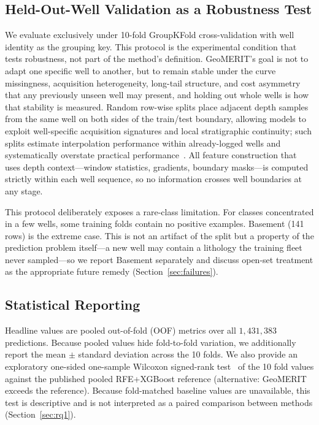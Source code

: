 \documentclass[bdcc,article,submit,pdftex,moreauthors]{Definitions/mdpi}
\begin{document}
\subsection{Held-Out-Well Validation as a Robustness Test}
\label{sec:protocol}
We evaluate exclusively under 10-fold GroupKFold cross-validation with well identity as the
grouping key. This protocol is the experimental condition that tests robustness, not part of
the method's definition. GeoMERIT's goal is not to adapt one specific well to another, but to
remain stable under the curve missingness, acquisition heterogeneity, long-tail structure,
and cost asymmetry that any previously unseen well may present, and holding out whole wells
is how that stability is measured. Random row-wise splits place adjacent depth samples from
the same well on both sides of the train/test boundary, allowing models to exploit
well-specific acquisition signatures and local stratigraphic continuity; such splits estimate
interpolation performance within already-logged wells and systematically overstate practical
performance~\cite{rosenblatt2024,roberts2017cv,mila2022nndm}. All feature construction that
uses depth context---window statistics, gradients, boundary masks---is computed strictly
within each well sequence, so no information crosses well boundaries at any stage.

This protocol deliberately exposes a rare-class limitation. For classes concentrated in a few
wells, some training folds contain no positive examples. Basement (141 rows) is the extreme
case. This is not an artifact of the split but a property of the prediction problem itself---a
new well may contain a lithology the training fleet never sampled---so we report Basement
separately and discuss open-set treatment as the appropriate future remedy
(Section~\ref{sec:failures}).

\subsection{Statistical Reporting}
\label{sec:stats}
Headline values are pooled out-of-fold (OOF) metrics over all $1{,}431{,}383$ predictions.
Because pooled values hide fold-to-fold variation, we additionally report the mean
$\pm$ standard deviation across the 10 folds. We also provide an exploratory one-sided
one-sample Wilcoxon signed-rank test~\cite{wilcoxon1945} of the 10 fold values against the
published pooled RFE+XGBoost reference (alternative: GeoMERIT exceeds the reference).
Because fold-matched baseline values are unavailable, this test is descriptive and is not
interpreted as a paired comparison between methods (Section~\ref{sec:rq1}).
\end{document}
